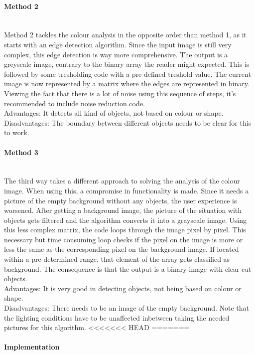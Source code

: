 \documentclass[11pt]{article}
\begin{document}
\paragraph{Method 2}\mbox{}\\
Method 2 tackles the colour analysis in the opposite order than method 1, as it starts with an edge detection algorithm. Since the input image is still very complex, this edge detection is way more comprehensive. The output is a greyscale image, contrary to the binary array the reader might expected. This is followed by some tresholding code with a pre-defined treshold value. The current image is now represented by a matrix where the edges are represented in binary. Viewing the fact that there is a lot of noise using this sequence of steps, it's recommended to include noise reduction code. 
\\Advantages: It detects all kind of objects, not based on colour or shape.
\\Disadvantages: The boundary between different objects needs to be clear for this to work.

\paragraph{Method 3}\mbox{}\\
The third way takes a different approach to solving the analysis of the colour image. When using this, a compromise in functionality is made. Since it needs a picture of the empty background without any objects, the user experience is worsened. After getting a background image, the picture of the situation with objects gets filtered and the algorithm converts it into a grayscale image. Using this less complex matrix, the code loops through the image pixel by pixel. This necessary but time consuming loop checks if the pixel on the image is more or less the same as the corresponding pixel on the background image. If located within a pre-determined range, that element of the array gets classified as background. The consequence is that the output is a binary image with clear-cut objects.
\\Advantages: It is very good in detecting objects, not being based on colour or shape.
\\Disadvantages: There needs to be an image of the empty background. Note that the lighting conditions have to be unaffected inbetween taking the needed pictures for this algorithm.
<<<<<<< HEAD
=======

\paragraph{Implementation}\mbox{}\\
\end{document}
